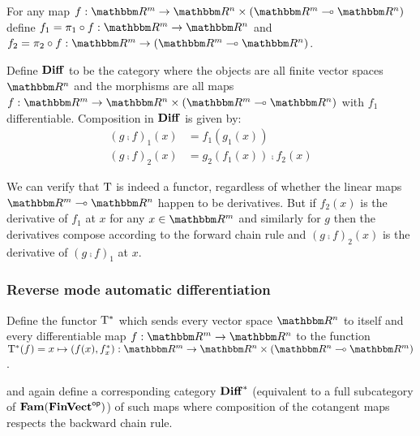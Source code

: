 For any map $f: \RR^m \to \RR^n \times (\RR^m \linearto \RR^n)$ define $f_1 = \pi_1 \comp f: \RR^m \to \RR^n$
and $f_2 = \pi_2 \comp f: \RR^m \to (\RR^m \linearto \RR^n)$.

\begin{definition}[$\Diff$]
\label{def:auto-diff:Diff}
Define $\Diff$ to be the category where the objects are all finite vector spaces $\RR^n$ and the morphisms
are all maps $f: \RR^m \to \RR^n \times (\RR^m \linearto \RR^n)$ with $f_1$ differentiable. Composition in
$\Diff$ is given by:
\begin{align*}
(g \comp f)_1(x) &= f_1(g_1(x)) \\
(g \comp f)_2(x) &= g_2(f_1(x)) \comp f_2(x)
\end{align*}
\end{definition}

We can verify that $\mathrm{T}$ is indeed a functor, regardless of whether the linear maps $\RR^m \linearto
\RR^n$ happen to be derivatives. But if $f_2(x)$ is the derivative of $f_1$ at $x$ for any $x \in \RR^m$ and
similarly for $g$ then the derivatives compose according to the forward chain rule and $(g \comp f)_2(x)$ is
the derivative of $(g \comp f)_1$ at $x$.

\subsubsection{Reverse mode automatic differentiation}

\begin{definition}
Define the functor $\mathrm{T}^*$ which sends every vector space $\RR^n$ to itself and every differentiable map
$f: \RR^m \to \RR^n$ to the function $\cotangents(f) = x \mapsto (f(x), \pullf{f}_x): \RR^m \to \RR^n \times
(\RR^n \linearto \RR^m)$.
\end{definition}

\noindent and again define a corresponding category $\mathbf{Diff}^*$ (equivalent to a full subcategory of
$\mathbf{Fam}(\mathbf{FinVect}^{\mathsf{op}})$) of such maps where composition of the cotangent maps respects the backward chain rule.

